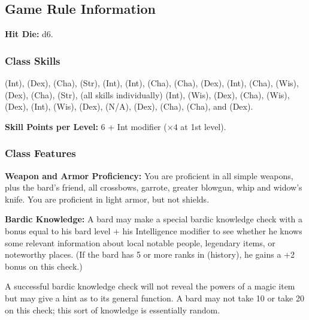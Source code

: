 \subsection{Game Rule Information}

\textbf{Hit Die:} d6.

\subsubsection{Class Skills}
 (Int),  (Dex),  (Cha),  (Str),  (Int),  (Int),  (Cha),  (Cha),  (Dex),  (Int),  (Cha),  (Wis),  (Dex),  (Cha),  (Str),  (all skills individually) (Int),  (Wis),  (Dex),  (Cha),  (Wis),  (Dex),  (Int),  (Wis),  (Dex),  (N/A),  (Dex),  (Cha),  (Cha), and  (Dex).

\textbf{Skill Points per Level:} 6 + Int modifier ($\times4$ at 1st level).

\subsubsection{Class Features}

\textbf{Weapon and Armor Proficiency:} You are proficient in all simple weapons, plus the bard's friend, all crossbows, garrote, greater blowgun, whip and widow's knife. You are proficient in light armor, but not shields.

\textbf{Bardic Knowledge:} A bard may make a special bardic knowledge check with a bonus equal to his bard level + his Intelligence modifier to see whether he knows some relevant information about local notable people, legendary items, or noteworthy places. (If the bard has 5 or more ranks in  (history), he gains a +2 bonus on this check.)

A successful bardic knowledge check will not reveal the powers of a magic item but may give a hint as to its general function. A bard may not take 10 or take 20 on this check; this sort of knowledge is essentially random.



